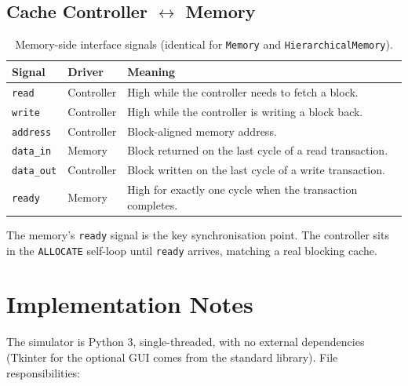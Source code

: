 \documentclass[11pt,a4paper]{article}
\begin{document}
\subsection{Cache Controller $\leftrightarrow$ Memory}

\begin{table}[h]
    \centering
    \caption{Memory-side interface signals (identical for \texttt{Memory} and \texttt{HierarchicalMemory}).}
    \begin{tabularx}{\linewidth}{@{}llX@{}}
        \toprule
        \textbf{Signal} & \textbf{Driver} & \textbf{Meaning} \\
        \midrule
        \texttt{read}       & Controller & High while the controller needs to fetch a block. \\
        \texttt{write}      & Controller & High while the controller is writing a block back. \\
        \texttt{address}    & Controller & Block-aligned memory address. \\
        \texttt{data\_in}   & Memory     & Block returned on the last cycle of a read transaction. \\
        \texttt{data\_out}  & Controller & Block written on the last cycle of a write transaction. \\
        \texttt{ready}      & Memory     & High for exactly one cycle when the transaction completes. \\
        \bottomrule
    \end{tabularx}
\end{table}

The memory's \texttt{ready} signal is the key synchronisation point. The
controller sits in the \texttt{ALLOCATE} self-loop until \texttt{ready}
arrives, matching a real blocking cache.

\section{Implementation Notes}\label{sec:impl}

The simulator is Python 3, single-threaded, with no external dependencies
(Tkinter for the optional GUI comes from the standard library). File
responsibilities:
\end{document}
